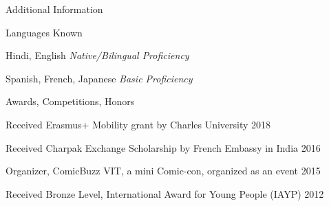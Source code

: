\documentclass{resume}
\begin{document}
\begin{rSection}{Additional Information}
 
    \begin{rSubsection}{Languages Known}{}{}{}
        \item Hindi, English \hfill {\em Native/Bilingual Proficiency}
        \item Spanish, French, Japanese \hfill {\em Basic Proficiency}
    \end{rSubsection}

    \begin{rSubsection}{Awards, Competitions, Honors}{}{}
    
        \item Received Erasmus+ Mobility grant by Charles University
            \hfill {2018}
        
        \item Received Charpak Exchange Scholarship by French Embassy in India 
            \hfill {2016}
        
        \item {Organizer, ComicBuzz VIT, a mini Comic-con, organized as an 
            event} \hfill {2015}
        
        \item Received Bronze Level, International Award for Young People (IAYP)
            \hfill {2012}
    
    \end{rSubsection}

\end{rSection}

\end{document}
